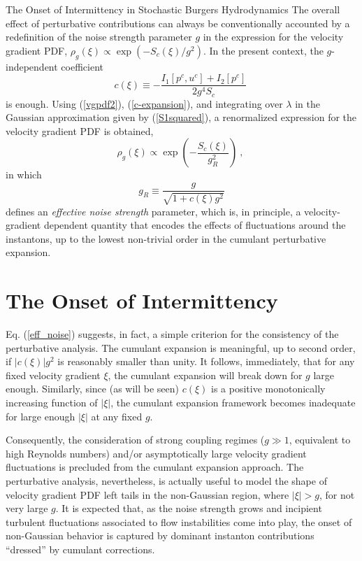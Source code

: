 \begin{chapter}{The Onset of Intermittency in Stochastic Burgers Hydrodynamics}
The overall effect of perturbative contributions can always be conventionally accounted by a redefinition of the noise strength parameter $g$ in the expression for the velocity gradient PDF, $\rho_g( \xi) \propto \exp ( - S_c(\xi) /g^2 )$. In the present context, the $g$-independent coefficient
\begin{equation}
    c(\xi) \equiv - \frac{I_1 [p^c,u^c] + I_2 [p^c]}{2g^4 S_c } \ \label{c-xi}
\end{equation}
is enough.
Using (\ref{vgpdf2}), (\ref{c-expansion}), and integrating over $\lambda$ in the Gaussian approximation given by (\ref{S1squared}), a renormalized expression for the velocity gradient PDF is obtained,
\begin{equation}
\rho_g(\xi) \propto \exp \left ( -  \frac{S_c (\xi) }{g_R^2} \right ) \ , \ \label{eff_vgpdf}
\end{equation}
in which
\begin{equation}
g_R \equiv \frac{g}{ \sqrt{1 + c(\xi)g^2}} \label{eff_noise}
\end{equation}
defines an {\textit{effective noise strength}} parameter, which is, in principle, a velocity-gradient dependent quantity that encodes the effects of fluctuations around the instantons, up to the lowest non-trivial order in the cumulant perturbative expansion.

\section{The Onset of Intermittency}

Eq. (\ref{eff_noise}) suggests, in fact, a simple criterion for the consistency of the perturbative analysis.
The cumulant expansion is meaningful, up to second order, if $|c(\xi)|g^2$ is reasonably smaller than unity. It follows, immediately, that for any fixed velocity gradient $\xi$, the cumulant expansion will break down for $g$ large enough. Similarly, since  (as will be seen) $c(\xi)$ is a positive monotonically increasing function of $|\xi|$, the cumulant expansion framework becomes inadequate for large enough $|\xi|$ at any fixed $g$.

Consequently, the consideration of strong coupling regimes ($g \gg 1$, equivalent to high Reynolds numbers) and/or asymptotically large velocity gradient fluctuations is precluded from the cumulant expansion approach. The perturbative analysis, nevertheless, is actually useful to model the shape of velocity gradient PDF left tails in the non-Gaussian region, where $|\xi| > g$, for not very large $g$.
It is expected that, as the noise strength grows and incipient turbulent fluctuations associated to flow instabilities come into play, the onset of non-Gaussian behavior is captured by dominant instanton contributions \enquote{dressed} by cumulant corrections.


\end{chapter}

